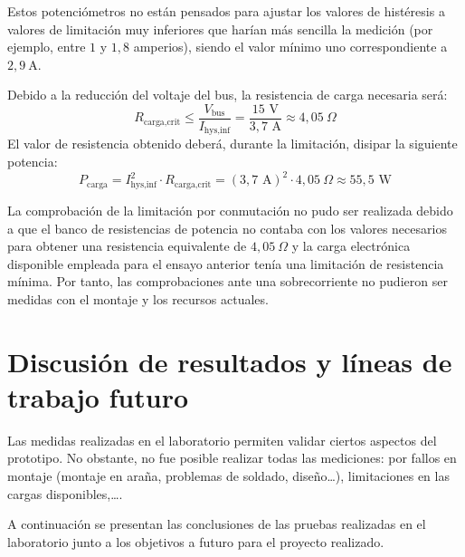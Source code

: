 \documentclass[12pt]{report} %
\begin{document}
Estos potenciómetros no están pensados para ajustar los valores de histéresis a valores de limitación muy inferiores que harían más sencilla la medición (por ejemplo, entre $1$ y $1{,}8$ amperios), siendo el valor mínimo uno correspondiente a $2{,}9~\text{A}$.

Debido a la reducción del voltaje del bus, la resistencia de carga necesaria será:
\begin{equation}
    R_{\text{carga,crit}} \le \frac{V_{\text{bus}}}{I_{\text{hys,inf}}} = \frac{15\text{ V}}{3{,}7\text{ A}} \approx 4{,}05\ \Omega
\end{equation}
El valor de resistencia obtenido deberá, durante la limitación, disipar la siguiente potencia:
\begin{equation}
    P_{\text{carga}} = I_{\text{hys,inf}}^2 \cdot R_{\text{carga,crit}} = (3{,}7\text{ A})^2 \cdot 4{,}05\ \Omega \approx 55{,}5\text{ W}
\end{equation}

La comprobación de la limitación por conmutación no pudo ser realizada debido a que el banco de resistencias de potencia no contaba con los valores necesarios para obtener una resistencia equivalente de $4{,}05\ \Omega$ y la carga electrónica disponible empleada para el ensayo anterior tenía una limitación de resistencia mínima. Por tanto, las comprobaciones ante una sobrecorriente no pudieron ser medidas con el montaje y los recursos actuales.

\section{Discusión de resultados y líneas de trabajo futuro}
\label{sec:discusion_resultados}

Las medidas realizadas en el laboratorio permiten validar ciertos aspectos del prototipo. No obstante, no fue posible realizar todas las mediciones: por fallos en montaje (montaje en araña, problemas de soldado, diseño\dots), limitaciones en las cargas disponibles,\dots.

A continuación se presentan las conclusiones de las pruebas realizadas en el laboratorio junto a los objetivos a futuro para el proyecto realizado.
\end{document}
